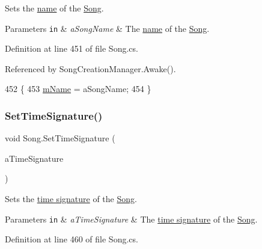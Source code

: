Sets the \hyperlink{group___song_priv_var_ga6a5e6c1e4aa92939e2b5c1e3d9908df8}{name} of the \hyperlink{class_song}{Song}. 


\begin{DoxyParams}[1]{Parameters}
\mbox{\tt in}  & {\em a\+Song\+Name} & The \hyperlink{group___song_priv_var_ga6a5e6c1e4aa92939e2b5c1e3d9908df8}{name} of the \hyperlink{class_song}{Song}. \\
\hline
\end{DoxyParams}


Definition at line 451 of file Song.\+cs.



Referenced by Song\+Creation\+Manager.\+Awake().


\begin{DoxyCode}
452     \{
453         \hyperlink{group___song_priv_var_ga6a5e6c1e4aa92939e2b5c1e3d9908df8}{mName} = aSongName;
454     \}
\end{DoxyCode}
\mbox{\label{group___song_pub_func_gaf9f2c7e6f4400f6f9854e68e70a49470}} 
\subsubsection{\texorpdfstring{Set\+Time\+Signature()}{SetTimeSignature()}}
{\footnotesize\ttfamily void Song.\+Set\+Time\+Signature (\begin{DoxyParamCaption}\item[{\hyperlink{group___music_structs_struct_music_1_1_time_signature}{Music.\+Time\+Signature}}]{a\+Time\+Signature }\end{DoxyParamCaption})}



Sets the \hyperlink{group___music_structs_struct_music_1_1_time_signature}{time signature} of the \hyperlink{class_song}{Song}. 


\begin{DoxyParams}[1]{Parameters}
\mbox{\tt in}  & {\em a\+Time\+Signature} & The \hyperlink{group___music_structs_struct_music_1_1_time_signature}{time signature} of the \hyperlink{class_song}{Song}. \\
\hline
\end{DoxyParams}


Definition at line 460 of file Song.\+cs.



